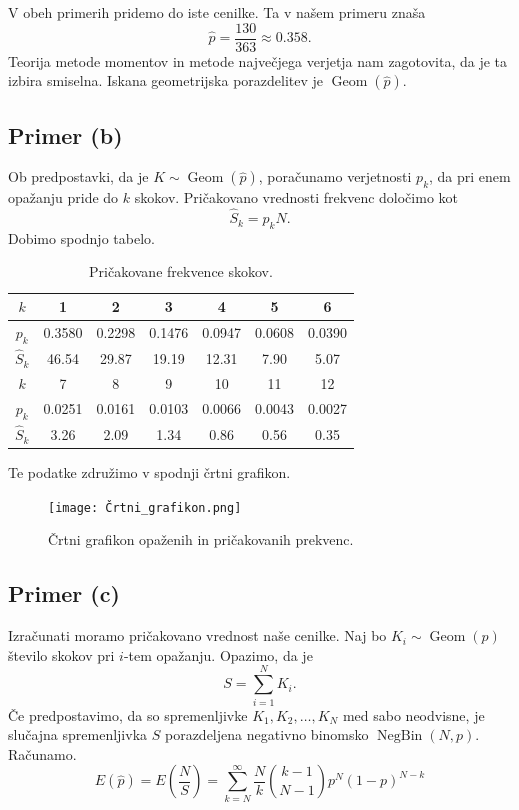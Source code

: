 \documentclass[a4paper,11pt]{article}
\DeclareMathOperator{\Geom}{Geom}
\DeclareMathOperator{\NegBin}{NegBin}
\begin{document}
V obeh primerih pridemo do iste cenilke.
Ta v našem primeru znaša 
\[\hat{p} = \frac{130}{363} \approx 0.358.\]
Teorija metode momentov in metode največjega verjetja nam zagotovita, da je ta izbira smiselna.
Iskana geometrijska porazdelitev je $\Geom(\hat{p})$.

\subsection*{Primer (b)}

Ob predpostavki, da je $K \sim \Geom(\hat{p})$, poračunamo verjetnosti $p_k$, da pri enem opažanju pride do $k$ skokov.
Pričakovano vrednosti frekvenc določimo kot
\[\hat{S}_k = p_k N.\]
Dobimo spodnjo tabelo.
\begin{table}[H]
    \centering
    \begin{tabular}{|c|c|c|c|c|c|c|}
    \hline
    $k$ & 1 & 2 & 3 & 4 & 5 & 6 \\ \hline
    $p_k$ & 0.3580 & 0.2298 & 0.1476 & 0.0947 & 0.0608 & 0.0390  \\ \hline
    $\hat{S}_k$ & 46.54 & 29.87 & 19.19 & 12.31 & 7.90 & 5.07 \\ \hline
    $k$ & 7 & 8 & 9 & 10 & 11 & 12 \\ \hline
    $p_k$ & 0.0251 & 0.0161 & 0.0103 & 0.0066 & 0.0043 & 0.0027 \\ \hline
    $\hat{S}_k$ & 3.26 & 2.09 & 1.34 & 0.86 & 0.56 & 0.35 \\ \hline
\end{tabular}
\caption{Pričakovane frekvence skokov.}
\label{PricakovaneFreq}
\end{table}
Te podatke združimo v spodnji črtni grafikon.
\begin{figure}[H]
    \centering
    \texttt{[image: Črtni\_grafikon.png]}
    \caption{Črtni grafikon opaženih in pričakovanih prekvenc.}
\end{figure}


\subsection*{Primer (c)}

Izračunati moramo pričakovano vrednost naše cenilke.
Naj bo $K_i \sim \Geom(p)$ število skokov pri $i$-tem opažanju. Opazimo, da je
\[S = \sum_{i=1}^N K_i.\]
Če predpostavimo, da so spremenljivke $K_1, K_2, \ldots, K_N$ med sabo neodvisne, 
je slučajna spremenljivka $S$ porazdeljena negativno binomsko $\NegBin(N,p)$.
Računamo.
\[E(\hat{p}) = E(\frac{N}{S}) = \sum_{k=N}^{\infty} \frac{N}{k} \binom{k-1}{N-1}p^N(1-p)^{N-k}\]  





\end{document}
